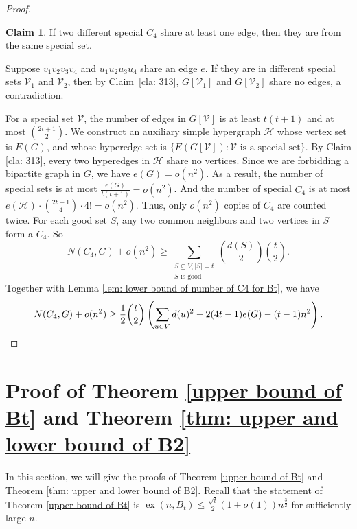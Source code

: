 \documentclass[11pt,a4paper]{article}
\theoremstyle{definition}
\newtheorem{claimthm}{Claim}[section]
\newenvironment{claimproof}
  {\renewcommand{\qedsymbol}{\ensuremath{\blacksquare}}\proof}
  {\endproof}
  {\endproof}
\DeclareMathOperator{\ex}{ex}
\begin{document}
\begin{proof}
        \begin{claimthm}\label{cla: 314}
            If two different special $C_4$ share at least one edge, then they are from the same special set.
        \end{claimthm}
        \begin{claimproof}
            Suppose $v_1v_2v_3v_4$ and $u_1u_2u_3u_4$ share an edge $e$. If they are in different special sets $\mathcal{V}_1$ and $\mathcal{V}_2$, then by Claim~\ref{cla: 313}, $G[\mathcal{V}_1]$ and $G[\mathcal{V}_2]$ share no edges, a contradiction.
        \end{claimproof}

        For a special set $\mathcal{V}$, the number of edges in $G[\mathcal{V}]$ is at least $t(t+1)$ and at most $\binom{2t+1}{2}$.
        We construct an auxiliary simple hypergraph $\mathcal{H}$ whose vertex set is $E(G)$, and whose hyperedge set is $\{E(G[\mathcal{V}]): \mathcal{V} \text{ is a special set}\}$.
        By Claim \ref{cla: 313}, every two hyperedges in $\mathcal{H}$ share no vertices.
        Since we are forbidding a bipartite graph in $G$, we have $e(G) = o(n^2)$.
        As a result, the number of special sets is at most $\frac{e(G)}{t(t+1)}=o(n^2)$. 
        And the number of special $C_4$ is at most $e(\mathcal{H})\cdot \binom{2t+1}{4} \cdot 4!=o(n^2)$.
        Thus, only $o(n^2)$ copies of $C_4$ are counted twice.
        For each good set $S$, any two common neighbors and two vertices in $S$ form a $C_4$. So
        \begin{equation*}
            N(C_4, G) + o(n^2) \geq \sum_{\substack{S \subseteq V, |S| = t \\ S \text{ is good}}} \binom{d(S)}{2} \binom{t}{2}.
        \end{equation*}
        Together with Lemma \ref{lem: lower bound of number of C4 for Bt}, we have
        \begin{equation*}
            N(C_4, G) + o(n^2) \geq \frac{1}{2} \binom{t}{2} \left(\sum_{u \in V} d(u)^2 - 2(4t-1) e(G) - (t-1) n^2 \right). \qedhere
        \end{equation*}
        \end{proof} 


    \section{Proof of Theorem \ref{upper bound of Bt} and Theorem \ref{thm: upper and lower bound of B2}}\label{sec: Bt}

        In this section, we will give the proofs of Theorem \ref{upper bound of Bt} and Theorem \ref{thm: upper and lower bound of B2}.
        Recall that the statement of Theorem \ref{upper bound of Bt} is $\ex(n, B_t) \leq \frac{\sqrt{t}}{2} (1 + o(1)) n^{\frac{3}{2}}$ for sufficiently large $n$.
\end{document}
